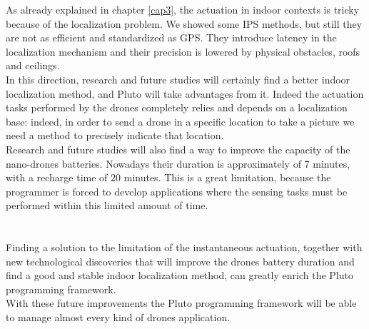 As already explained in chapter \ref{cap3}, the actuation in indoor contexts is tricky because of the localization problem.
We showed some IPS methods, but still they are not as efficient and standardized as GPS.
They introduce latency in the localization mechanism and their precision is lowered by physical obstacles, roofs and ceilings.
\\

In this direction, research and future studies will certainly find a better indoor localization method, and Pluto will take advantages from it.
Indeed the actuation tasks performed by the drones completely relies and depends on a localization base: indeed, in order to send a drone in a specific location to take a picture we need a method to precisely indicate that location.
\\

Research and future studies will also find a way to improve the capacity of the nano-drones batteries. 
Nowadays their duration is approximately of 7 minutes, with a recharge time of 20 minutes.
This is a great limitation, because the programmer is forced to develop applications where the sensing tasks must be performed within this limited amount of time.
\\
\\
\\

Finding a solution to the limitation of the instantaneous actuation, together with new technological discoveries that will improve the drones battery duration and find a good and stable indoor localization method, can greatly enrich the Pluto programming framework.
\\

With these future improvements the Pluto programming framework will be able to manage almost every kind of drones application.
